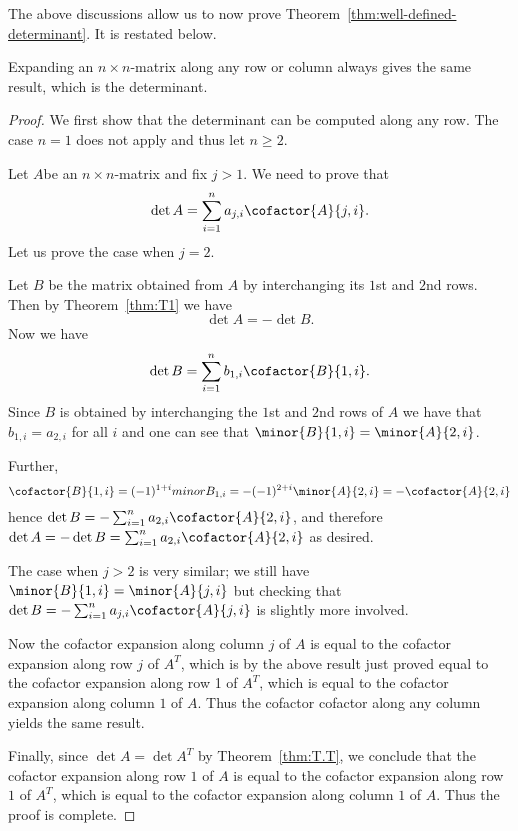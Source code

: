 The above discussions allow us to now prove
Theorem~\ref{thm:well-defined-determinant}. It is restated below.

\begin{theorem}{}{}
  Expanding an $n\times n$-matrix along any row or column always gives
  the same result, which is the determinant.
\end{theorem}

\begin{proof}
  We first show that the determinant can be computed along any
  row. The case $n=1$ does not apply and thus let $n \geq 2$.


  Let $A$be an $n\times n$-matrix and fix $j>1$. We need to prove that
  \begin{equation*}
    \det A=\sum_{i=1}^n a_{j,i} \cofactor{A}{j,i}.
  \end{equation*}
  Let us prove the case when $j=2$.

  Let $B$ be the matrix obtained from $A$ by interchanging its $1$st
  and $2$nd rows.  Then by Theorem~\ref{thm:T1} we have
  \begin{equation*}
    \det A=-\det B.
  \end{equation*}
  Now we have
  \begin{equation*}
    \det B=\sum_{i=1}^n b_{1,i} \cofactor{B}{1,i}.
  \end{equation*}
  Since $B$ is obtained by interchanging the $1$st and $2$nd rows of
  $A$ we have that $b_{1,i}=a_{2,i}$ for all $i$ and one can see that
  $\minor{B}{1,i}=\minor{A}{2,i}$.

  Further,
  \begin{equation*}
    \cofactor{B}{1,i}=(-1)^{1+i} minor B_{1,i}=- (-1)^{2+i} \minor{A}{2,i} = - \cofactor{A}{2,i}
  \end{equation*}
  hence $\det B=-\sum_{i=1}^n a_{2,i} \cofactor{A}{2,i}$, and therefore
  $\det A=-\det B= \sum_{i=1}^n a_{2,i} \cofactor{A}{2,i}$ as desired.

  The case when $j>2$ is very similar; we still have
  $\minor{B}{1,i}=\minor{A}{j,i}$ but checking that
  $\det B=-\sum_{i=1}^n a_{j,i} \cofactor{A}{j,i}$ is slightly more
  involved.

  Now the cofactor expansion along column $j$ of $A$ is equal to the
  cofactor expansion along row $j$ of $A^T$, which is by the above
  result just proved equal to the cofactor expansion along row 1 of
  $A^T$, which is equal to the cofactor expansion along column $1$ of
  $A$. Thus the cofactor cofactor along any column yields the same
  result.

  Finally, since $\det A=\det A^T$ by Theorem~\ref{thm:T.T}, we
  conclude that the cofactor expansion along row $1$ of $A$ is equal
  to the cofactor expansion along row $1$ of $A^T$, which is equal to
  the cofactor expansion along column $1$ of $A$. Thus the proof is
  complete.
\end{proof}
